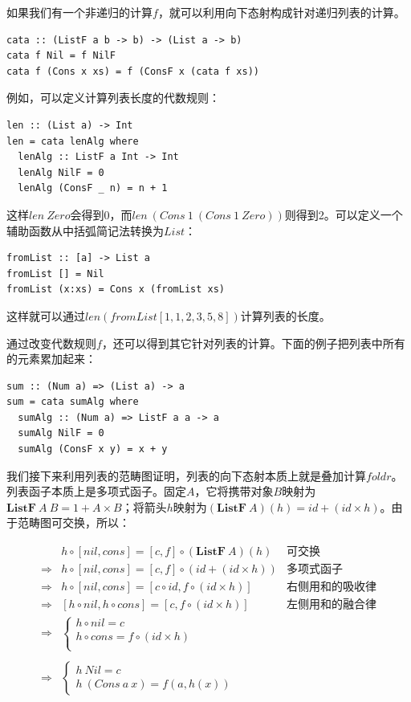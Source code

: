 \documentclass[b5paper]{ctexart}
\begin{document}
\begin{example}
如果我们有一个非递归的计算$f$，就可以利用向下态射构成针对递归列表的计算。

\lstset{frame=single}
\begin{lstlisting}[style=Haskell]
cata :: (ListF a b -> b) -> (List a -> b)
cata f Nil = f NilF
cata f (Cons x xs) = f (ConsF x (cata f xs))
\end{lstlisting}

例如，可以定义计算列表长度的代数规则：

\begin{lstlisting}[style=Haskell]
len :: (List a) -> Int
len = cata lenAlg where
  lenAlg :: ListF a Int -> Int
  lenAlg NilF = 0
  lenAlg (ConsF _ n) = n + 1
\end{lstlisting}

这样$len\ Zero$会得到0，而$len\ (Cons\ 1\ (Cons\ 1\ Zero))$则得到2。可以定义一个辅助函数从中括弧简记法转换为$List$：

\begin{lstlisting}
fromList :: [a] -> List a
fromList [] = Nil
fromList (x:xs) = Cons x (fromList xs)
\end{lstlisting}

这样就可以通过$len (fromList [1, 1, 2, 3, 5, 8])$计算列表的长度。

通过改变代数规则$f$，还可以得到其它针对列表的计算。下面的例子把列表中所有的元素累加起来：

\begin{lstlisting}
sum :: (Num a) => (List a) -> a
sum = cata sumAlg where
  sumAlg :: (Num a) => ListF a a -> a
  sumAlg NilF = 0
  sumAlg (ConsF x y) = x + y
\end{lstlisting}

我们接下来利用列表的范畴图证明，列表的向下态射本质上就是叠加计算$foldr$。
列表函子本质上是多项式函子。固定$A$，它将携带对象$B$映射为$\mathbf{ListF}\ A\ B = 1 + A \times B$；将箭头$h$映射为$(\mathbf{ListF}\ A)(h) = id + (id \times h)$。由于范畴图可交换，所以：

\[
\begin{array}{rll}
            & h \circ [nil, cons] = [c, f] \circ (\mathbf{ListF}\ A)(h) & \text{可交换} \\
\Rightarrow & h \circ [nil, cons] = [c, f] \circ (id + (id \times h)) & \text{多项式函子} \\
\Rightarrow & h \circ [nil, cons] = [c \circ id, f \circ (id \times h)] & \text{右侧用和的吸收律} \\
\Rightarrow & [h \circ nil, h \circ cons] = [c, f \circ (id \times h)] & \text{左侧用和的融合律} \\
\Rightarrow &
  \begin{cases}
    h \circ nil = c \\
    h \circ cons = f \circ (id \times h) \\
  \end{cases} & \\
\\
\Rightarrow &
  \begin{cases}
    h\ Nil = c \\
    h\ (Cons\ a\ x) = f(a, h(x))
  \end{cases} & \\
\end{array}
\]


\end{example}
\end{document}
